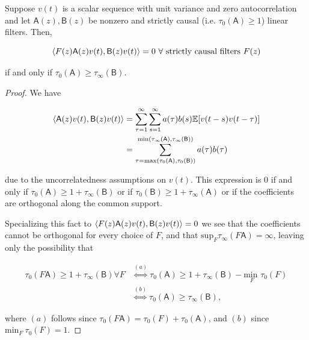 \documentclass[12pt]{article}
\def\B{\mathsf{B}}  %
\def\A{\mathsf{A}}  %
\begin{document}
\begin{lemma}
  \label{lem:time_lag_cancellation}
  Suppose $v(t)$ is a scalar sequence with unit variance and zero
  autocorrelation and let $\A(z), \B(z)$ be nonzero and strictly
  causal (i.e. $\tau_0(\A) \ge 1$) linear filters.  Then,

  \begin{equation}
    \inner{F(z)\A(z)v(t)}{\B(z)v(t)} = 0\ \forall \text{ strictly causal filters } F(z)
  \end{equation}

  if and only if $\tau_0(\A) \ge \tau_\infty(\B)$.
\end{lemma}
\begin{proof}
  We have

  \begin{align}
    \inner{\A(z)v(t)}{\B(z)v(t)} &= \sum_{\tau = 1}^\infty \sum_{s = 1}^\infty a(\tau)b(s)\E[v(t - s)v(t - \tau)]\\
    &= \sum_{\tau = \text{max}(\tau_0(\A), \tau_0(\B))}^{\text{min}(\tau_\infty(\A), \tau_\infty(\B))} a(\tau) b(\tau)\\
  \end{align}

  due to the uncorrelatedness assumptions on $v(t)$.  This expression
  is $0$ if and only if $\tau_0(\A) \ge 1 + \tau_\infty(\B)$ or if
  $\tau_0(\B) \ge 1 + \tau_\infty(\A)$ or if the coefficients are
  orthogonal along the common support.

  Specializing this fact to $\inner{F(z)\A(z)v(t)}{\B(z)v(t)} = 0$ we
  see that the coefficients cannot be orthogonal for every choice of
  $F$, and that $\text{sup}_F \tau_\infty(F\A) = \infty$, leaving only
  the possibility that

  \begin{align*}
    \tau_0(F\A) \ge 1 + \tau_\infty(\B) \forall F &\overset{(a)}{\iff} \tau_0(\A) \ge 1 + \tau_\infty(\B) - \underset{F}{\text{min }} \tau_0(F)\\
    &\overset{(b)}{\iff} \tau_0(\A) \ge \tau_\infty(\B),
  \end{align*}

  where $(a)$ follows since $\tau_0(F\A) = \tau_0(F) + \tau_0(\A)$,
  and $(b)$ since $\text{min}_F\ \tau_0(F) = 1$.
\end{proof}
\end{document}
